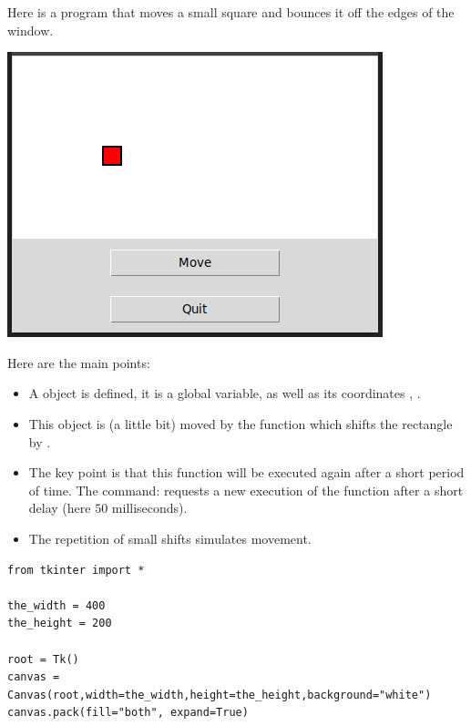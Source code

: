 \documentclass[11pt,class=report,crop=false]{standalone}
\begin{document}
\begin{cours}


Here is a program that moves a small square and bounces it off the edges of the window.

\begin{center}
\includegraphics[scale=\myscale,scale=0.5]{screen-blocks-lesson-move-en}
\end{center}

Here are the main points:
\begin{itemize}
  \item A   object is defined, it is a global variable, as well as its coordinates , .
  
  \item This object is (a little bit) moved by the  function which shifts the rectangle by .
    
  \item The key point is that this function will be executed again after a short period of time. The command: 
  requests a new execution of the  function after a short delay (here $50$ milliseconds).
  
  \item The repetition of small shifts simulates movement.
\end{itemize}

\begin{lstlisting}
from tkinter import *

the_width = 400
the_height = 200

root = Tk()     
canvas = Canvas(root,width=the_width,height=the_height,background="white")
canvas.pack(fill="both", expand=True)


\end{lstlisting}
\end{cours}
\end{document}
